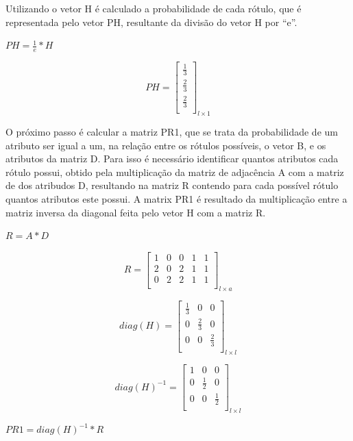 Utilizando o vetor H é calculado a probabilidade de cada rótulo, que é representada
pelo vetor PH, resultante da divisão do vetor H por ``e''.

\begin{center}
$PH= \frac{1}{e} * H$
\end{center}

$$PH=\left[
\begin{array}{c}
\frac{1}{3} \\
\frac{2}{3} \\
\frac{2}{3} \\
\end{array}
\right]_{l \times 1}$$

O próximo passo é calcular a matriz PR1, que se trata da probabilidade de um
atributo ser igual a um, na relação entre os rótulos possíveis, o vetor B, e os
atributos da matriz D. Para isso é necessário identificar quantos atributos cada
rótulo possui, obtido pela multiplicação da matriz de adjacência A com a matriz
de dos atribudos D, resultando na matriz R contendo para cada possível rótulo
quantos atributos este possui. A matrix PR1 é resultado da multiplicação entre a
matriz inversa da diagonal feita pelo vetor H com a matriz R.

\begin{center}
$R = A * D$
\end{center}

$$R=\left[
\begin{array}{ccccc}
1 & 0 & 0 & 1 & 1 \\
2 & 0 & 2 & 1 & 1 \\
0 & 2 & 2 & 1 & 1 \\
\end{array}
\right]_{l \times a}$$

$$diag(H)=\left[
\begin{array}{ccc}
\frac{1}{3} & 0 & 0 \\
0 & \frac{2}{3} & 0 \\
0 & 0 & \frac{2}{3} \\
\end{array}
\right]_{l \times l}$$

$$diag(H)^{-1}=\left[
\begin{array}{ccc}
1 & 0 & 0 \\
0 & \frac{1}{2} & 0 \\
0 & 0 & \frac{1}{2} \\
\end{array}
\right]_{l \times l}$$

\begin{center}
$PR1 = diag(H)^{-1} * R$
\end{center}

